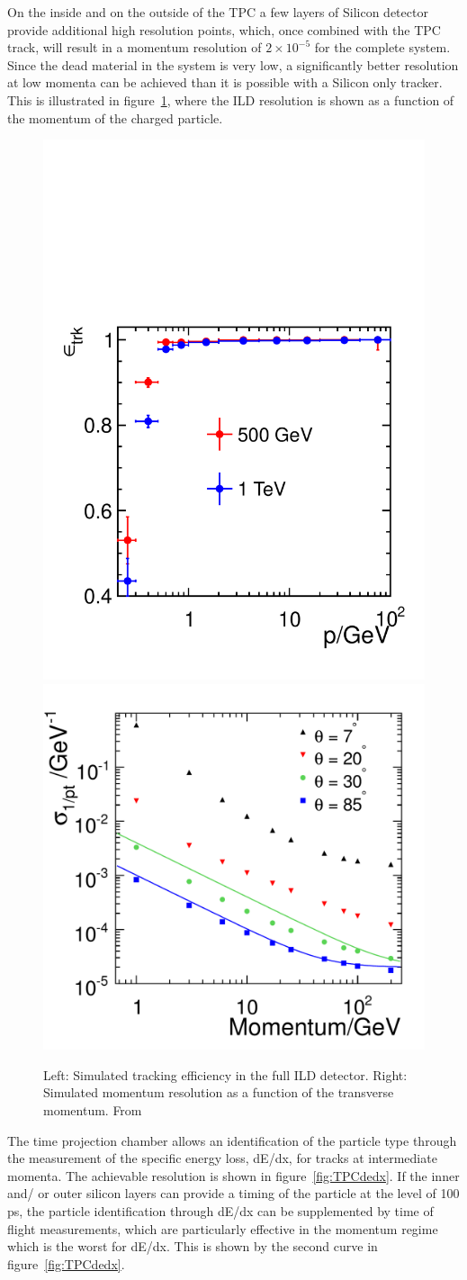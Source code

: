 \documentclass[%
 amsmath,amssymb,
 aps,
]{revtex4-1}
\begin{document}
On the inside and on the outside of the TPC a few layers of Silicon detector provide additional high resolution points, which, once combined with the TPC track, will result in a momentum resolution of $2 \times 10^{-5}$ for the complete system. Since the dead material in the system is very low, a significantly better resolution at low momenta can be achieved than it is possible with a Silicon only tracker. This is illustrated in figure~\ref{fig:momentumvsp}, where the ILD resolution is shown as a function of the momentum of the charged particle. 

\begin{figure}
    \centering
    \includegraphics[width=0.384\hsize]{figures/FullTrackPerformance_Effy_P.pdf}
    \includegraphics[width=0.4\hsize]{figures/deltaInvP_all_fits.pdf}
    \caption{Left: Simulated tracking efficiency in the full ILD detector. Right: Simulated momentum resolution as a function of the transverse momentum. From \cite{ILD-DBD}}
    \label{fig:momentumvsp}
\end{figure}

The time projection chamber allows an identification of the particle type through the measurement of the specific energy loss, dE/dx, for tracks at intermediate momenta. The achievable resolution is shown in figure~\ref{fig:TPCdedx}. If the inner and/ or outer silicon layers can provide a timing of the particle at the level of 100 ps, the particle identification through dE/dx can be supplemented by time of flight measurements, which are particularly effective in the momentum regime which is the worst for dE/dx. This is shown by the second curve in figure~\ref{fig:TPCdedx}. 
\end{document}
